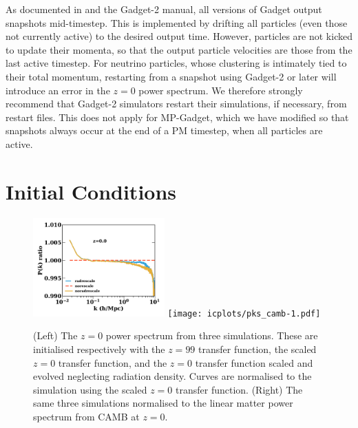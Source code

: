 \documentclass[useAMS, usenatbib]{mnras}
\begin{document}
As documented in \cite{Springel_2005} and the Gadget-2 manual, all versions of Gadget output snapshots mid-timestep. This is implemented by drifting all particles (even those not currently active) to the desired output time. However, particles are not kicked to update their momenta, so that the output particle velocities are those from the last active timestep. For neutrino particles, whose clustering is intimately tied to their total momentum, restarting from a snapshot using Gadget-2 or later will introduce an error in the $z=0$ power spectrum. We therefore strongly recommend that Gadget-2 simulators restart their simulations, if necessary, from restart files. This does not apply for MP-Gadget, which we have modified so that snapshots always occur at the end of a PM timestep, when all particles are active.

\section{Initial Conditions}
\label{sec:initcond}

\begin{figure}
\includegraphics[width=0.45\textwidth]{icplots/pks_rel-1.pdf}
\texttt{[image: icplots/pks\_camb-1.pdf]}
  \caption{(Left) The $z=0$ power spectrum from three simulations.
  These are initialised respectively with the $z=99$ transfer function,
  the scaled $z=0$ transfer function, and the $z=0$ transfer function
  scaled and evolved neglecting radiation density.
  Curves are normalised to the simulation using the scaled $z=0$ transfer function.
  (Right) The same three simulations normalised to the linear matter
  power spectrum from CAMB at $z=0$.}
  \label{fig:rescaling0}
\end{figure}
\end{document}
